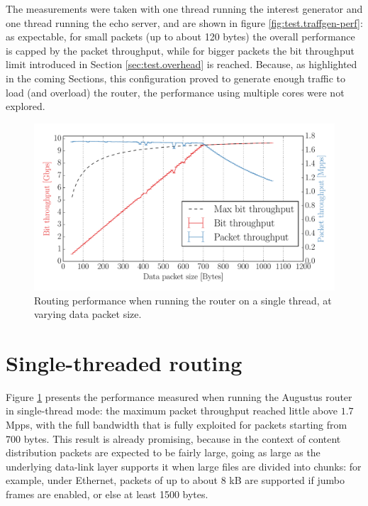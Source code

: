 \documentclass[11pt,a4paper,twoside,titlepage,openany]{book}
\begin{document}
The measurements were taken with one thread running the interest generator and one thread running the echo server, and are shown in figure \ref{fig:test.traffgen-perf}: as expectable, for small packets (up to about 120 bytes) the overall performance is capped by the packet throughput, while for bigger packets the bit throughput limit introduced in Section \ref{sec:test.overhead} is reached.
Because, as highlighted in the coming Sections, this configuration proved to generate enough traffic to load (and overload) the router, the performance using multiple cores were not explored.

\begin{figure}[tb]
  \begin{center}
    \includegraphics[width=1.0\textwidth]{img/augustus_increasing_len_0x1.pdf}
    \caption[Single-threaded routing performance at varying data packet size]{Routing performance when running the router on a single thread, at varying data packet size.}
    \label{fig:test.incr_len_single}
  \end{center}
\end{figure}
\section{Single-threaded routing}\label{sec:test.singlecore}
Figure \ref{fig:test.incr_len_single} presents the performance measured when running the Augustus router in single-thread mode: the maximum packet throughput reached little above $1.7$ \acrfull{Mpps}, with the full bandwidth that is fully exploited for packets starting from 700 bytes. This result is already promising, because in the context of content distribution packets are expected to be fairly large, going as large as the underlying data-link layer supports it when large files are divided into chunks: for example, under Ethernet, packets of up to about 8 kB are supported if jumbo frames are enabled, or else at least 1500 bytes.
\end{document}
